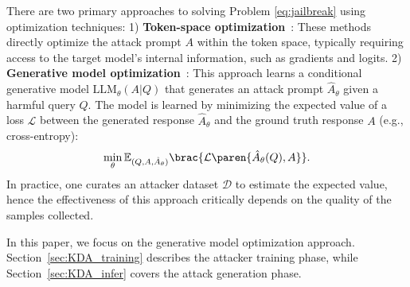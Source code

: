 There are two primary approaches to solving Problem \ref{eq:jailbreak} using optimization techniques: 
1) \textbf{Token-space optimization}~\citep{zou_universal_2023, liu_autodan_2024}: These methods directly optimize the attack prompt $A$ within the token space, typically requiring access to the target model's internal information, such as gradients and logits. 
2) \textbf{Generative model optimization}~\citep{liao_amplegcg_2024, paulus_advprompter_2024}: This approach learns a conditional generative model $\text{LLM}_{\theta}(A | Q)$ that generates an attack prompt $\hat{A}_\theta$ given a harmful query $Q$. The model is learned by minimizing the expected value of a loss $\mathcal{L}$ between the generated response $\hat{A}_{\theta}$ and the ground truth response $A$ (e.g., cross-entropy):
\begin{align}\label{eq:generator}
    \begin{split}
        \min_{\theta} \mathbb{E}_{(Q, A, \hat{A}_{\theta})}\brac{\mathcal{L} \paren{\hat{A}_\theta(Q), A}}.
    \end{split}
\end{align}
In practice, one curates an attacker dataset $\mathcal{D}$ to estimate the expected value, hence the effectiveness of this approach critically depends on the quality of the samples collected. 

In this paper, we focus on the generative model optimization approach. Section~\ref{sec:KDA_training} describes the attacker training phase, while Section~\ref{sec:KDA_infer} covers the attack generation phase.











